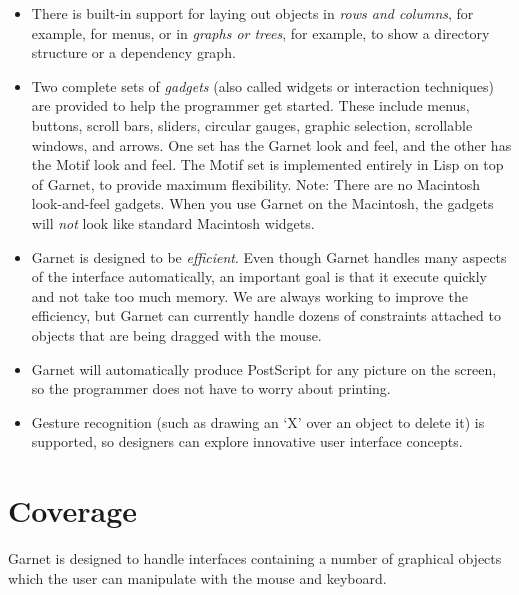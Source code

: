 \documentclass{report}
\begin{document}
\begin{itemize}
\item There is built-in support for laying out objects in {\it rows
    and columns}, for example, for menus, or in {\it graphs or trees},
  for example, to show a directory structure or a dependency graph.
  
\item Two complete sets of {\it gadgets} (also called widgets or
  interaction techniques) are provided to help the programmer get
  started.  These include menus, buttons, scroll bars, sliders,
  circular gauges, graphic selection, scrollable windows, and arrows.
  One set has the Garnet look and feel, and the other has the Motif
  look and feel.  The Motif set is implemented entirely in Lisp on top
  of Garnet, to provide maximum flexibility.  Note: There are no
  Macintosh look-and-feel gadgets.  When you use Garnet on the
  Macintosh, the gadgets will {\it not} look like standard Macintosh
  widgets.
  
\item Garnet is designed to be {\it efficient}.  Even though Garnet
  handles many aspects of the interface automatically, an important
  goal is that it execute quickly and not take too much memory.  We
  are always working to improve the efficiency, but Garnet can
  currently handle dozens of constraints attached to objects that are
  being dragged with the mouse.
  
\item Garnet will automatically produce PostScript for any picture on
  the screen, so the programmer does not have to worry about printing.
  
\item Gesture recognition (such as drawing an `X' over an object to
  delete it) is supported, so designers can explore innovative user
  interface concepts.
\end{itemize}

\section{Coverage}
 Garnet is designed to handle interfaces containing a
number of graphical objects which the user can manipulate with the
mouse and keyboard.
\end{document}
